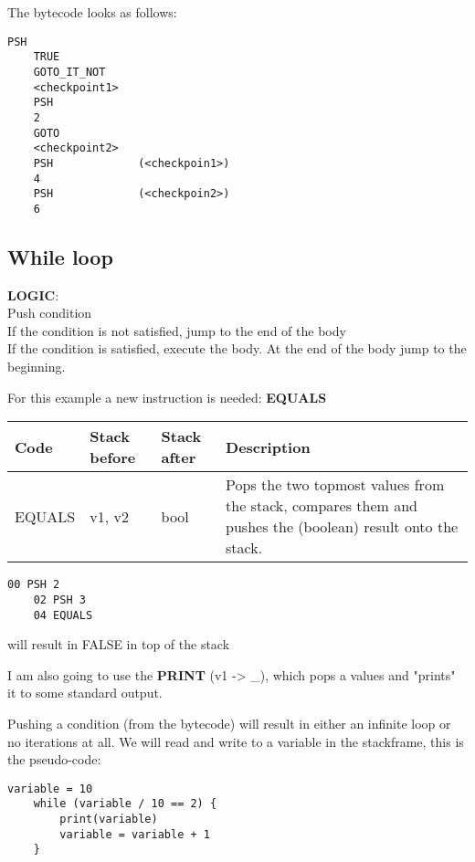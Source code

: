 \documentclass[../documentation.tex]{subfiles}
\begin{document}
The bytecode looks as follows:

\begin{lstlisting}[style=generic]
    PSH
    TRUE
    GOTO_IT_NOT
    <checkpoint1>
    PSH
    2
    GOTO
    <checkpoint2>
    PSH             (<checkpoin1>)
    4
    PSH             (<checkpoin2>)
    6
\end{lstlisting}

\pagebreak

\subsection{While loop}

\textbf{LOGIC}:
\\
Push condition
\\
If the condition is not satisfied, jump to the end of the body
\\
If the condition is satisfied, execute the body. At the end of the body jump to the beginning.

For this example a new instruction is needed: \textbf{EQUALS}

\bgroup{}
\def\arraystretch{1.25}
\begin{center}
    \begin{tabular}{ |l|l|l|p{7cm}| }
        \hline
        \textbf{Code} & \textbf{Stack before} & \textbf{Stack after} & \textbf{Description} \\
        \hline
        EQUALS & v1, v2 & bool & Pops the two topmost values from the stack, compares them and pushes the (boolean) result onto the stack.        \\
        \hline
    \end{tabular}
\end{center}
\egroup{}

\begin{lstlisting}[style=generic]
    00 PSH 2
    02 PSH 3
    04 EQUALS
\end{lstlisting}

will result in FALSE in top of the stack

I am also going to use the \textbf{PRINT} (v1 -> \_), which pops a values and "prints" it to some standard output.

Pushing a condition (from the bytecode) will result in either an infinite loop or no iterations at all.
We will read and write to a variable in the stackframe, this is the pseudo-code:

\begin{lstlisting}[style=generic]
    variable = 10
    while (variable / 10 == 2) {
        print(variable)
        variable = variable + 1
    }
\end{lstlisting}
\end{document}
